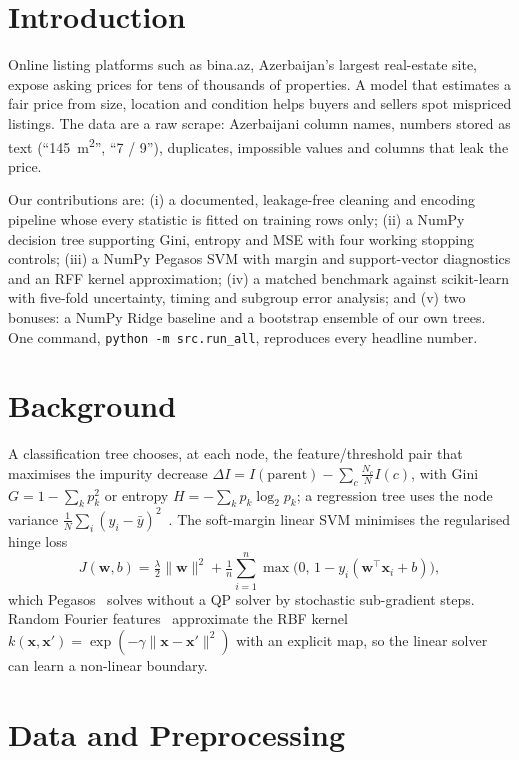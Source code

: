 \documentclass[10pt,twocolumn,a4paper]{article}
\begin{document}
\section{Introduction}
Online listing platforms such as bina.az, Azerbaijan's largest real-estate
site, expose asking prices for tens of thousands of properties. A model that
estimates a fair price from size, location and condition helps buyers and
sellers spot mispriced listings. The data are a raw scrape: Azerbaijani
column names, numbers stored as text (``145~m\textsuperscript{2}'',
``7 / 9''), duplicates, impossible values and columns that leak the price.

Our contributions are: (i) a documented, leakage-free cleaning and encoding
pipeline whose every statistic is fitted on training rows only;
(ii) a NumPy decision tree supporting Gini, entropy and MSE with four working
stopping controls; (iii) a NumPy Pegasos SVM with margin and support-vector
diagnostics and an RFF kernel approximation; (iv) a matched benchmark against
scikit-learn with five-fold uncertainty, timing and subgroup error analysis;
and (v) two bonuses: a NumPy Ridge baseline and a bootstrap ensemble of our own
trees. One command, \texttt{python -m src.run\_all}, reproduces every
headline number.

\section{Background}
A classification tree chooses, at each node, the feature/threshold pair that
maximises the impurity decrease
$\Delta I = I(\text{parent}) - \sum_{c} \tfrac{N_c}{N} I(c)$, with Gini
$G = 1-\sum_k p_k^2$ or entropy $H=-\sum_k p_k\log_2 p_k$; a regression tree
uses the node variance $\tfrac{1}{N}\sum_i (y_i-\bar y)^2$~\cite{cart}.
The soft-margin linear SVM minimises the regularised hinge loss
\begin{equation}
  J(\mathbf{w},b)=\tfrac{\lambda}{2}\lVert\mathbf{w}\rVert^{2}
  +\tfrac{1}{n}\sum_{i=1}^{n}\max\!\big(0,\,1-y_i(\mathbf{w}^{\top}\mathbf{x}_i+b)\big),
\end{equation}
which Pegasos~\cite{pegasos} solves without a QP solver by stochastic
sub-gradient steps. Random Fourier features~\cite{rff} approximate the RBF
kernel $k(\mathbf{x},\mathbf{x}')=\exp(-\gamma\lVert\mathbf{x}-\mathbf{x}'\rVert^2)$
with an explicit map, so the linear solver can learn a non-linear boundary.

\section{Data and Preprocessing}
\end{document}
